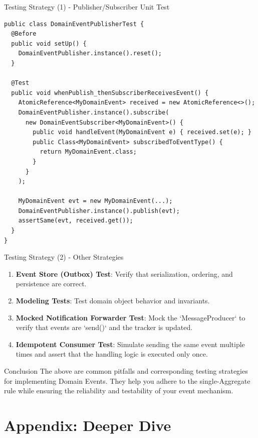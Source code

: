 \documentclass{beamer}
\begin{document}
\begin{frame}[fragile]{Testing Strategy (1) - Publisher/Subscriber Unit Test}
  \lstset{language=Java, basicstyle=\ttfamily\tiny}
  \begin{lstlisting}
public class DomainEventPublisherTest {
  @Before
  public void setUp() {
    DomainEventPublisher.instance().reset();
  }

  @Test
  public void whenPublish_thenSubscriberReceivesEvent() {
    AtomicReference<MyDomainEvent> received = new AtomicReference<>();
    DomainEventPublisher.instance().subscribe(
      new DomainEventSubscriber<MyDomainEvent>() {
        public void handleEvent(MyDomainEvent e) { received.set(e); }
        public Class<MyDomainEvent> subscribedToEventType() { 
          return MyDomainEvent.class; 
        }
      }
    );

    MyDomainEvent evt = new MyDomainEvent(...);
    DomainEventPublisher.instance().publish(evt);
    assertSame(evt, received.get());
  }
}
  \end{lstlisting}
\end{frame}

\begin{frame}{Testing Strategy (2) - Other Strategies}
  \begin{enumerate}
    \item \textbf{Event Store (Outbox) Test}: Verify that serialization, ordering, and persistence are correct.
    \item \textbf{Modeling Tests}: Test domain object behavior and invariants.
    \item \textbf{Mocked Notification Forwarder Test}: Mock the `MessageProducer` to verify that events are `send()` and the tracker is updated.
    \item \textbf{Idempotent Consumer Test}: Simulate sending the same event multiple times and assert that the handling logic is executed only once.
  \end{enumerate}
\end{frame}

\begin{frame}{Conclusion}
  The above are common pitfalls and corresponding testing strategies for implementing Domain Events. They help you adhere to the single-Aggregate rule while ensuring the reliability and testability of your event mechanism.
  \vfill
\end{frame}


\appendix
\section{Appendix: Deeper Dive}
\end{document}
